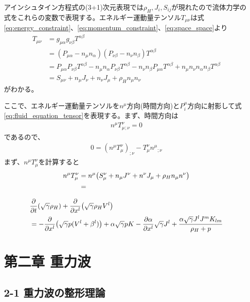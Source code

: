 \documentclass[autodetect-engine,dvi=dvipdfmx,ja=standard, 10pt, a4paper]{bxjsarticle}
\begin{document}
アインシュタイン方程式の(3+1)次元表現では$\rho_H, J_i, S_{ij}$が現れたので流体力学の式をこれらの変数で表現する。エネルギー運動量テンソル$T_{\mu\nu}$は式\eqref{eq:energy_constraint}、\eqref{eq:momentum_constraint}、\eqref{eq:space_space}より
\begin{align}
	T_{\mu\nu}& = g_{\mu\alpha}g_{\nu\beta}T^{\alpha\beta}\nonumber\\
	&=(P_{\mu\alpha} - n_\mu n_\alpha)(P_{\nu\beta} - n_\nu n_\beta)T^{\alpha\beta}\nonumber\\
	&=P_{\mu\alpha}P_{\nu\beta}T^{\alpha\beta} - n_\mu n_\alpha P_{\nu\beta}T^{\alpha\beta} - n_\nu n_\beta P_{\mu\alpha}T^{\alpha\beta} + n_\mu n_\nu n_\alpha n_\beta T^{\alpha\beta}\nonumber\\
	&= S_{\mu\nu} + n_\mu J_\nu + n_\nu J_\mu +\rho_H n_\mu n_\nu 
\end{align}
がわかる。

ここで、エネルギー運動量テンソルを$n^\mu$方向(時間方向)と$P_i^\mu$方向に射影して式\eqref{eq:fluid_equation_tensor}を表現する。まず、時間方向は
\begin{align}
	n^\mu T_{\mu}^{\nu}{}_{;\nu} = 0
\end{align}
であるので、
\begin{align}
	0 = (n^\mu T_{\mu}^{\nu})_{;\nu} - T_{\mu}^{\nu} n^\mu{}_{;\nu} 
\end{align}
まず、$n^\mu T_{\mu}^{\nu}$を計算すると
\begin{align}
	n^\mu T_{\mu}^{\nu} &= n^\mu \qty( S_{\mu}^{\nu} + n_\mu J^{\nu} + n^{\nu} J_\mu + \rho_H n_\mu n^{\nu} )\nonumber\\
	&= 
\end{align}

\begin{align}
	&\pdv{t}\qty(\sqrt{\gamma}\rho_H) + \pdv{x^l}\qty(\sqrt{\gamma}\rho_H V^l)\nonumber\\
	&=-\pdv{x^l}\qty(\sqrt{\gamma}p(V^l+\beta^l)) +\alpha\sqrt{\gamma}pK - \pdv{\alpha}{x^l}\sqrt{\gamma}J^l+\frac{\alpha\sqrt{\gamma}J^lJ^m K_{lm}}{\rho_H + p}
\end{align}


\section*{第二章 重力波}
\subsection*{2-1 重力波の整形理論}
\end{document}
